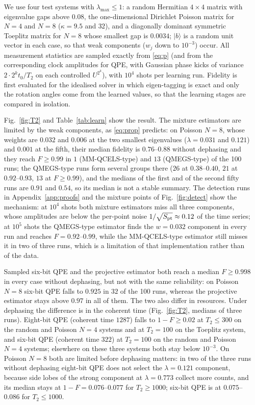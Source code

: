 \documentclass[journal]{IEEEtran}
\newcommand{\lmax}{\lambda_{\max}}
\begin{document}
We use four test systems with $\lmax\le1$: a random Hermitian $4\times4$ matrix with eigenvalue gaps above $0.08$, the one-dimensional Dirichlet Poisson matrix for $N=4$ and $N=8$ ($\kappa=9.5$ and $32$), and a diagonally dominant symmetric Toeplitz matrix for $N=8$ whose smallest gap is $0.0034$; $|b\rangle$ is a random unit vector in each case, so that weak components ($w_j$ down to $10^{-3}$) occur. All measurement statistics are sampled exactly from \eqref{eq:p} (and from the corresponding clock amplitudes for QPE, with Gaussian phase kicks of variance $2\cdot2^kt_0/T_2$ on each controlled $U^{2^k}$), with $10^4$ shots per learning run. Fidelity is first evaluated for the idealised solver in which eigen-tagging is exact and only the rotation angles come from the learned values, so that the learning stages are compared in isolation.

Fig.~\ref{fig:T2} and Table~\ref{tab:learn} show the result. The mixture estimators are limited by the weak components, as \eqref{eq:prop} predicts: on Poisson $N=8$, whose weights are $0.032$ and $0.006$ at the two smallest eigenvalues ($\lambda=0.031$ and $0.121$) and $0.001$ at the fifth, their median fidelity is $0.76$--$0.88$ without dephasing and they reach $F\ge0.99$ in $1$ (MM-QCELS-type) and $13$ (QMEGS-type) of the 100 runs; the QMEGS-type runs form several groups there ($26$ at $0.38$--$0.40$, $21$ at $0.92$--$0.93$, $13$ at $F\ge0.99$), and the medians of the first and of the second fifty runs are $0.91$ and $0.54$, so its median is not a stable summary. The detection runs in Appendix~\ref{app:proofs} and the mixture points of Fig.~\ref{fig:detect} show the mechanism: at $10^4$ shots both mixture estimators miss all three components, whose amplitudes are below the per-point noise $1/\sqrt{S_{\rm pt}}\approx0.12$ of the time series; at $10^5$ shots the QMEGS-type estimator finds the $w=0.032$ component in every run and reaches $F=0.92$--$0.99$, while the MM-QCELS-type estimator still misses it in two of three runs, which is a limitation of that implementation rather than of the data.

Sampled six-bit QPE and the projective estimator both reach a median $F\ge0.998$ in every case without dephasing, but not with the same reliability: on Poisson $N=8$ six-bit QPE falls to $0.925$ in $32$ of the 100 runs, whereas the projective estimator stays above $0.97$ in all of them. The two also differ in resources. Under dephasing the difference is in the coherent time (Fig.~\ref{fig:T2}, medians of three runs). Eight-bit QPE (coherent time $1287$) falls to $1-F\ge0.02$ at $T_2\le300$ on the random and Poisson $N=4$ systems and at $T_2=100$ on the Toeplitz system, and six-bit QPE (coherent time $322$) at $T_2=100$ on the random and Poisson $N=4$ systems; elsewhere on these three systems both stay below $10^{-3}$. On Poisson $N=8$ both are limited before dephasing matters: in two of the three runs without dephasing eight-bit QPE does not select the $\lambda=0.121$ component, because side lobes of the strong component at $\lambda=0.773$ collect more counts, and its median stays at $1-F=0.076$--$0.077$ for $T_2\ge1000$; six-bit QPE is at $0.075$--$0.086$ for $T_2\le1000$.
\end{document}
